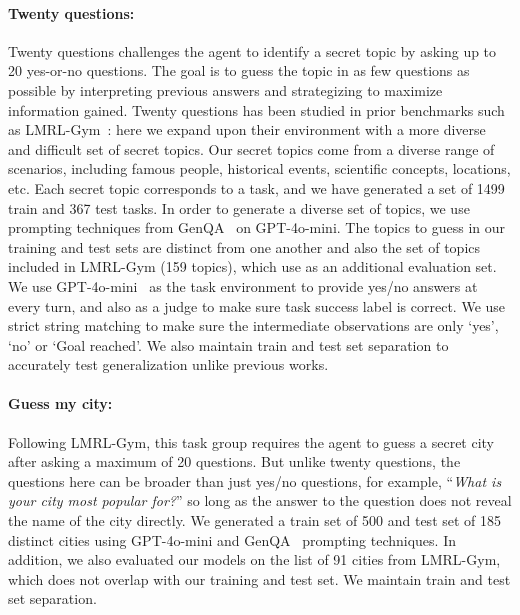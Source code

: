 \paragraph{Twenty questions: } 
Twenty questions challenges the agent to identify a secret topic by asking up to 20 yes-or-no questions. The goal is to guess the topic in as few questions as possible by interpreting previous answers and strategizing to maximize information gained. Twenty questions has been studied in prior benchmarks such as LMRL-Gym~\citep{abdulhai2023lmrl}: here we expand upon their environment with a more diverse and difficult set of secret topics. Our secret topics come from a diverse range of scenarios, including famous people, historical events, scientific concepts, locations, etc. Each secret topic corresponds to a task, and we have generated a set of 1499 train and 367 test tasks. In order to generate a diverse set of topics, we use prompting techniques from GenQA~\citep{chen2024genqageneratingmillionsinstructions} on GPT-4o-mini. The topics to guess in our training and test sets are distinct from one another and also the set of topics included in LMRL-Gym (159 topics), which use as an additional evaluation set. We use GPT-4o-mini~\citep{hurst2024gpt,openai2024gpt4technicalreport} as the task environment to provide yes/no answers at every turn, and also as a judge to make sure task success label is correct. We use strict string matching to make sure the intermediate observations are only `yes', `no' or `Goal reached'. We also maintain train and test set separation to accurately test generalization unlike previous works.

\paragraph{Guess my city: } Following LMRL-Gym, this task group requires the agent to guess a secret city after asking a maximum of 20 questions. 
But unlike twenty questions, the questions here can be broader than just yes/no questions, for example, ``\emph{What is your city most popular for?}'' so long as the answer to the question does not reveal the name of the city directly. We generated a train set of 500 and test set of 185 distinct cities using GPT-4o-mini and GenQA~\citep{chen2024genqageneratingmillionsinstructions} prompting techniques. In addition, we also evaluated our models on the list of 91 cities from LMRL-Gym, which does not overlap with our training and test set. We maintain train and test set separation.

